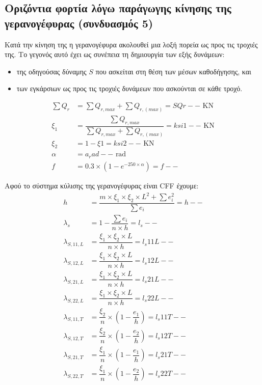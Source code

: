 
\subsection{Οριζόντια φορτία λόγω παράγωγης κίνησης της γερανογέφυρας (συνδυασμός 5)}
Κατά την κίνηση της η γερανογέφυρα ακολουθεί μια λοξή πορεία ως προς τις τροχιές της. Το γεγονός αυτό έχει ως συνέπεια τη δημιουργία των εξής δυνάμεων:
\begin{itemize} 
\item της οδηγούσας δύναμης $S$ που ασκείται στη θέση των μέσων καθοδήγησης, και
\item των εγκάρσιων ως προς τις τροχιές δυνάμεων που ασκούνται σε κάθε τροχό.
\end{itemize}

\begin{align*}\sum{Q_r} &= \displaystyle\sum{Q_{r,max}} + \displaystyle\sum{Q_{r,(max)}} = SQr-- \text{ KN} \\ 
\xi_1    &= \dfrac{\displaystyle\sum{Q_{r,max}}}{\displaystyle\sum{Q_{r,max}} + \displaystyle\sum{Q_{r,(max)}}} = ksi1-- \text{ KN} \\ 
\xi_2    &= 1 - \xi1 = ksi2-- \text{ KN} \\ 
\alpha    &= a_rad-- \text{ rad} \\ 
f         &= 0.3 \times \left(1 - e^{-250 \times \alpha}\right) = f--
\end{align*}

Αφού το σύστημα κύλισης της γερανογέφυρας είναι CFF έχουμε:
\begin{align*}
h                &= \dfrac{m \times \xi_1 \times \xi_2 \times L^2 + \sum{e_i^2}}{\sum{e_i}} = h-- \\ 
\lambda_s        &= 1 - \dfrac{\sum{e_i}}{n \times h} =  l_s-- \\ 
\lambda_{S,11,L} &= \dfrac{\xi_1 \times \xi_2 \times L}{n \times h}= l_s11L-- \\ 
\lambda_{S,12,L} &= \dfrac{\xi_1 \times \xi_2 \times L}{n \times h}= l_s12L-- \\ 
\lambda_{S,21,L} &= \dfrac{\xi_1 \times \xi_2 \times L}{n \times h}= l_s21L-- \\ 
\lambda_{S,22,L} &= \dfrac{\xi_1 \times \xi_2 \times L}{n \times h}= l_s22L-- \\ 
\lambda_{S,11,T} &= \dfrac{\xi_2}{n} \times \left(1 - \dfrac{e_1}{h}\right) = l_s11T-- \\ 
\lambda_{S,12,T} &= \dfrac{\xi_2}{n} \times \left(1 - \dfrac{e_2}{h}\right) = l_s12T-- \\ 
\lambda_{S,21,T} &= \dfrac{\xi_1}{n} \times \left(1 - \dfrac{e_1}{h}\right) = l_s21T-- \\ 
\lambda_{S,22,T} &= \dfrac{\xi_1}{n} \times \left(1 - \dfrac{e_2}{h}\right) = l_s22T--
\end{align*}

